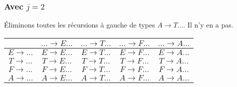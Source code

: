 \documentclass[class=article]{standalone}
\begin{document}
\subsubsection*{Avec $j = 2$}
Éliminons toutes les récursions à gauche de types $A \rightarrow T...$. Il n'y en a pas.
\begin{center}
    \begin{tabular}{c|c|c|c|c|}
        \cellcolor[HTML]{FFFFFF}                     & 
        \cellcolor[HTML]{FFFFFF} $... \rightarrow E...$ &
        \cellcolor[HTML]{FFFFFF} $... \rightarrow T...$ & 
        \cellcolor[HTML]{FFFFFF} $... \rightarrow F...$ & 
        \cellcolor[HTML]{FFFFFF} $... \rightarrow A...$ \\
    \hline
        \cellcolor[HTML]{FFFFFF} $E \rightarrow ...$ & 
        \cellcolor[HTML]{FF0000} $E \rightarrow E...$ & 
        \cellcolor[HTML]{ABFF00} $E \rightarrow T...$ & 
        \cellcolor[HTML]{ABFF00} $E \rightarrow F...$ & 
        \cellcolor[HTML]{ABFF00} $E \rightarrow A...$ \\
    \hline
        \cellcolor[HTML]{FFFFFF} $T \rightarrow ...$ & 
        \cellcolor[HTML]{FF0000} $T \rightarrow E...$ & 
        \cellcolor[HTML]{FF0000} $T \rightarrow T...$ & 
        \cellcolor[HTML]{ABFF00} $T \rightarrow F...$ &
        \cellcolor[HTML]{ABFF00} $T \rightarrow A...$ \\
    \hline
        \cellcolor[HTML]{FFFFFF} $F \rightarrow ...$ &
        \cellcolor[HTML]{FF0000} $F \rightarrow E...$ &
        \cellcolor[HTML]{FF0000} $F \rightarrow T...$ & 
        \cellcolor[HTML]{FF0000} $F \rightarrow F...$ & 
        \cellcolor[HTML]{ABFF00} $F \rightarrow A...$ \\
    \hline
        \cellcolor[HTML]{FFFFFF} $A \rightarrow ...$ & 
        \cellcolor[HTML]{FF0000} $A \rightarrow E...$ & 
        \cellcolor[HTML]{FF0000} $A \rightarrow T...$ & 
        \cellcolor[HTML]{FFFFFF} $A \rightarrow F...$ & 
        \cellcolor[HTML]{FFFFFF} $A \rightarrow A...$ \\
    \hline
    \end{tabular}
\end{center}
\end{document}
